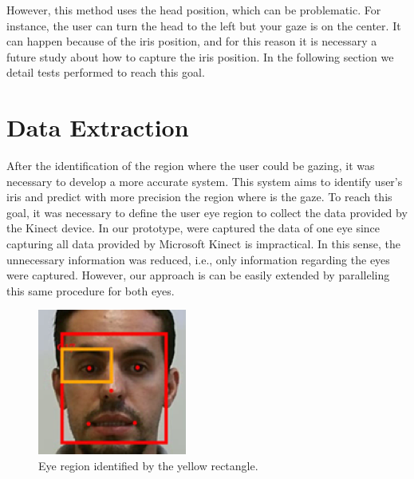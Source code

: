 \documentclass[10pt, conference]{IEEEtran}
\begin{document}
	However, this method uses the head position, which can be problematic.
	For instance, the user can turn the head to the left but your gaze is on the center. 
	It can happen because of the iris position, and for this reason it is necessary a future study about how to capture the iris position. 
    In the following section we detail tests performed to reach this goal.

\section{Data Extraction} \label{sec:dataExtraction}

	After the identification of the region where the user could be gazing, it was necessary to develop a more accurate system. 
	This system aims to identify user’s iris and predict with more precision the region where is the gaze. 
	To reach this goal, it was necessary to define the user eye region to collect the data provided by the Kinect device.
	In our prototype, were captured the data of one eye since capturing all data provided by Microsoft Kinect is impractical.
	In this sense, the unnecessary information was reduced, i.e., only information regarding the eyes were captured.
    However, our approach is can be easily extended by paralleling this same procedure for both eyes.

    \begin{figure}[t]
        \centering
        \includegraphics{figures/pic10.png}
        \caption{Eye region identified by the yellow rectangle.}
        \label{fig:fig10}
    \end{figure}
\end{document}
